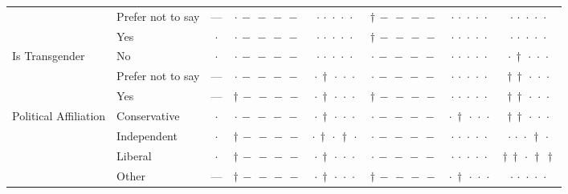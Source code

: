 {\begin{longtable}[t]{llcccccc}
 & Prefer not to say & --- & ${\cdot}\,{-}\,{-}\,{-}\,{-}$ & ${\cdot}\,{\cdot}\,{\cdot}\,{\cdot}\,{\cdot}$ & ${\dagger}\,{-}\,{-}\,{-}\,{-}$ & ${\cdot}\,{\cdot}\,{\cdot}\,{\cdot}\,{\cdot}$ & ${\cdot}\,{\cdot}\,{\cdot}\,{\cdot}\,{\cdot}$ \\
 & Yes & $\cdot$ & ${\cdot}\,{-}\,{-}\,{-}\,{-}$ & ${\cdot}\,{\cdot}\,{\cdot}\,{\cdot}\,{\cdot}$ & ${\dagger}\,{-}\,{-}\,{-}\,{-}$ & ${\cdot}\,{\cdot}\,{\cdot}\,{\cdot}\,{\cdot}$ & ${\cdot}\,{\cdot}\,{\cdot}\,{\cdot}\,{\cdot}$ \\
\cline{1-8}
\multirow[t]{3}{*}{Is Transgender} & No & $\cdot$ & ${\cdot}\,{-}\,{-}\,{-}\,{-}$ & ${\cdot}\,{\cdot}\,{\cdot}\,{\cdot}\,{\cdot}$ & ${\cdot}\,{-}\,{-}\,{-}\,{-}$ & ${\cdot}\,{\cdot}\,{\cdot}\,{\cdot}\,{\cdot}$ & ${\cdot}\,{\dagger}\,{\cdot}\,{\cdot}\,{\cdot}$ \\
 & Prefer not to say & --- & ${\cdot}\,{-}\,{-}\,{-}\,{-}$ & ${\cdot}\,{\dagger}\,{\cdot}\,{\cdot}\,{\cdot}$ & ${\cdot}\,{-}\,{-}\,{-}\,{-}$ & ${\cdot}\,{\cdot}\,{\cdot}\,{\cdot}\,{\cdot}$ & ${\dagger}\,{\dagger}\,{\cdot}\,{\cdot}\,{\cdot}$ \\
 & Yes & --- & ${\dagger}\,{-}\,{-}\,{-}\,{-}$ & ${\cdot}\,{\dagger}\,{\cdot}\,{\cdot}\,{\cdot}$ & ${\dagger}\,{-}\,{-}\,{-}\,{-}$ & ${\cdot}\,{\cdot}\,{\cdot}\,{\cdot}\,{\cdot}$ & ${\dagger}\,{\dagger}\,{\cdot}\,{\cdot}\,{\cdot}$ \\
\cline{1-8}
\multirow[t]{5}{*}{Political Affiliation} & Conservative & $\cdot$ & ${\cdot}\,{-}\,{-}\,{-}\,{-}$ & ${\cdot}\,{\dagger}\,{\cdot}\,{\cdot}\,{\cdot}$ & ${\cdot}\,{-}\,{-}\,{-}\,{-}$ & ${\cdot}\,{\dagger}\,{\cdot}\,{\cdot}\,{\cdot}$ & ${\dagger}\,{\dagger}\,{\cdot}\,{\cdot}\,{\cdot}$ \\
 & Independent & $\cdot$ & ${\dagger}\,{-}\,{-}\,{-}\,{-}$ & ${\cdot}\,{\dagger}\,{\cdot}\,{\dagger}\,{\cdot}$ & ${\cdot}\,{-}\,{-}\,{-}\,{-}$ & ${\cdot}\,{\cdot}\,{\cdot}\,{\cdot}\,{\cdot}$ & ${\cdot}\,{\cdot}\,{\cdot}\,{\dagger}\,{\cdot}$ \\
 & Liberal & $\cdot$ & ${\dagger}\,{-}\,{-}\,{-}\,{-}$ & ${\cdot}\,{\dagger}\,{\cdot}\,{\cdot}\,{\cdot}$ & ${\cdot}\,{-}\,{-}\,{-}\,{-}$ & ${\cdot}\,{\cdot}\,{\cdot}\,{\cdot}\,{\cdot}$ & ${\dagger}\,{\dagger}\,{\cdot}\,{\dagger}\,{\dagger}$ \\
 & Other & --- & ${\dagger}\,{-}\,{-}\,{-}\,{-}$ & ${\cdot}\,{\dagger}\,{\cdot}\,{\cdot}\,{\cdot}$ & ${\dagger}\,{-}\,{-}\,{-}\,{-}$ & ${\cdot}\,{\dagger}\,{\cdot}\,{\cdot}\,{\cdot}$ & ${\cdot}\,{\cdot}\,{\cdot}\,{\cdot}\,{\cdot}$ \\

\end{longtable}}
